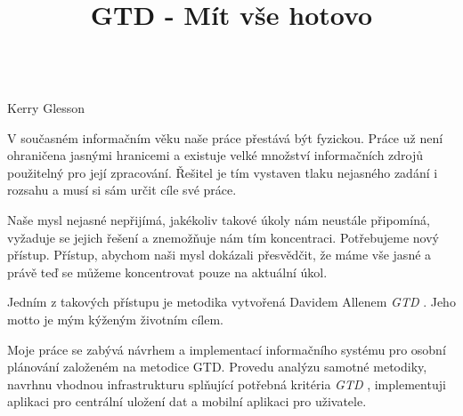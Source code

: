 \documentclass[thesis=B,czech]{FITthesis}[2012/06/26]
\title{GTD - Mít vše hotovo}
\newcommand{\GTD}{\textit{GTD }}
\begin{document}


\begin{introduction}
\begin{center}
\textit{}\\
Kerry Glesson
\end{center}

V současném informačním věku naše práce přestává být fyzickou. Práce už není ohraničena jasnými hranicemi a existuje velké množství informačních zdrojů použitelný pro její zpracování. Řešitel je tím vystaven tlaku nejasného zadání i rozsahu a musí si sám určit cíle své práce.

Naše mysl nejasné nepřijímá, jakékoliv takové úkoly nám neustále připomíná, vyžaduje se jejich řešení a znemožňuje nám tím koncentraci. Potřebujeme nový přístup. Přístup, abychom naši mysl dokázali přesvědčit, že máme vše jasné a právě teď se můžeme koncentrovat pouze na aktuální úkol.

Jedním z takových přístupu je metodika vytvořená Davidem Allenem \GTD\cite{gtd}. Jeho motto \textit{} je mým kýženým životním cílem.

Moje práce se zabývá návrhem a implementací informačního systému pro osobní plánování založeném na metodice GTD. Provedu analýzu samotné metodiky, navrhnu vhodnou infrastrukturu splňující potřebná kritéria \GTD\cite{gtd}, implementuji aplikaci pro centrální uložení dat a mobilní aplikaci pro uživatele.    

	
\end{introduction}
\end{document}

